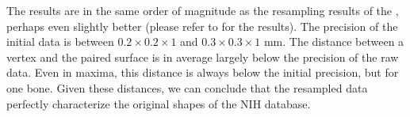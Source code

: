 The results are in the same order of magnitude as the resampling results of the \db*, perhaps even slightly better (please refer to  for the \db* results). The precision of the initial data is between $0.2\times 0.2 \times 1$ and $0.3\times 0.3 \times 1$ mm. The distance between a vertex and the paired surface is in average largely below the precision of the raw data. Even in maxima, this distance is always below the initial precision, but for one bone. Given these distances, we can conclude that the resampled data perfectly characterize the original shapes of the NIH database.





